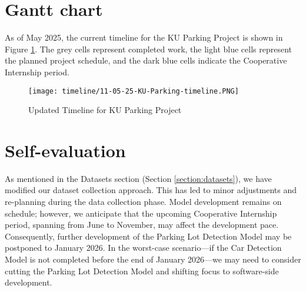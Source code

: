 \section{Gantt chart}
\label{section:gantt-chart}
As of May 2025, the current timeline for the KU Parking Project is shown in Figure \ref{fig:11-05-25-timeline-dev-progress}. The grey cells represent completed work, the light blue cells represent the planned project schedule, and the dark blue cells indicate the Cooperative Internship period.
\begin{figure}[H]
    \centering
    \texttt{[image: timeline/11-05-25-KU-Parking-timeline.PNG]}
    \caption{Updated Timeline for KU Parking Project}
    \label{fig:11-05-25-timeline-dev-progress}
\end{figure}

\section{Self-evaluation}
\label{section:self-evaluation}
As mentioned in the Datasets section (Section \ref{section:datasets}), we have modified our dataset collection approach. This has led to minor adjustments and re-planning during the data collection phase. Model development remains on schedule; however, we anticipate that the upcoming Cooperative Internship period, spanning from June to November, may affect the development pace. Consequently, further development of the Parking Lot Detection Model may be postponed to January 2026. In the worst-case scenario—if the Car Detection Model is not completed before the end of January 2026—we may need to consider cutting the Parking Lot Detection Model and shifting focus to software-side development.